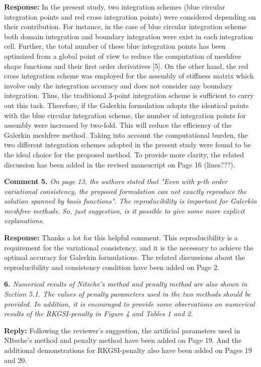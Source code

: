 \documentclass{article}
\begin{document}
\textbf{Response:} In the present study, two integration schemes (blue circular integration points and red cross integration points) were considered depending on their contribution. For instance, in the case of blue circular integration scheme both domain integration and boundary integration were exist in each integration cell. Further, the total number of these blue integration points has been optimized from a global point of view to reduce the computation of meshfree shape functions and their first order derivatives [5]. On the other hand, the red cross integration scheme was employed for the assembly of stiffness matrix which involve only the integration accuracy and does not consider any boundary integration. Thus, the traditional 3-point integration scheme is sufficient to carry out this task. Therefore, if the Galerkin formulation adopts the identical points with the blue circular integration scheme, the number of integration points for assembly were increased by two-fold. This will reduce the efficiency of the Galerkin meshfree method. Taking into account the computational burden, the two different integration schemes adopted in the present study were found to be the ideal choice for the proposed method. To provide more clarity, the related discussion has been added in the revised mansucript on Page 16 (lines???). 

\textbf{Comment 5.} \textit{On page 13, the authors stated that "Even with p-th order variational consistency, the proposed formulation can not exactly reproduce the solution spanned by basis functions". The reproducibility is important for Galerkin meshfree methods. So, just suggestion, is it possible to give some more explicit explanations.}

\textbf{Response:} Thanks a lot for this helpful comment. This reproducibility is a requirement for the variational consistency, and it is the necessary to achieve the optimal accuracy for Galerkin formulations. The related discussions about the reproducibility and consistency condition have been added on Page 2.

\textbf{6.} \textit{Numerical results of Nitsche's method and penalty method are also shown in Section 5.1. The values of penalty parameters used in the two methods should be provided. In addition, it is encouraged to provide some observations on numerical results of the RKGSI-penalty in Figure 4 and Tables 1 and 2.}

\textbf{Reply:} Following the reviewer's suggestion, the artificial parameters used in NItsche's method and penalty method have been added on Page 19. And the additional demonstrations for RKGSI-penalty also have been added on Pages 19 and 20. 
\end{document}
